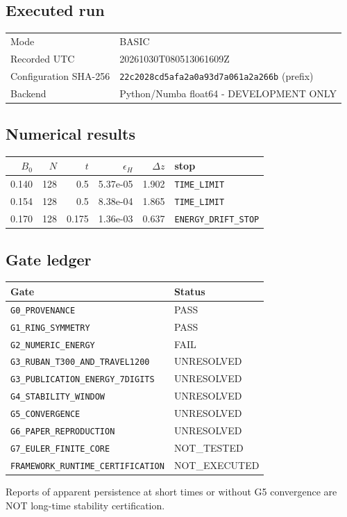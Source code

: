 \subsection*{Executed run}
\begin{tabular}{ll}\toprule
Mode & BASIC\\
Recorded UTC & 20261030T080513061609Z\\
Configuration SHA-256 & \texttt{22c2028cd5afa2a0a93d7a061a2a266b} (prefix)\\
Backend & Python/Numba float64 - DEVELOPMENT ONLY\\
\bottomrule\end{tabular}
\subsection*{Numerical results}
\begin{center}\small\begin{tabular}{rrrrrl}\toprule
$B_0$ & $N$ & $t$ & $\epsilon_H$ & $\Delta z$ & stop \\ \midrule
0.140 & 128 & 0.5 & 5.37e-05 & 1.902 & \texttt{TIME\_LIMIT} \\
0.154 & 128 & 0.5 & 8.38e-04 & 1.865 & \texttt{TIME\_LIMIT} \\
0.170 & 128 & 0.175 & 1.36e-03 & 0.637 & \texttt{ENERGY\_DRIFT\_STOP} \\
\bottomrule\end{tabular}\end{center}
\subsection*{Gate ledger}
\begin{tabular}{ll}\toprule Gate & Status \\ \midrule
\texttt{G0\_PROVENANCE} & PASS\\
\texttt{G1\_RING\_SYMMETRY} & PASS\\
\texttt{G2\_NUMERIC\_ENERGY} & FAIL\\
\texttt{G3\_RUBAN\_T300\_AND\_TRAVEL1200} & UNRESOLVED\\
\texttt{G3\_PUBLICATION\_ENERGY\_7DIGITS} & UNRESOLVED\\
\texttt{G4\_STABILITY\_WINDOW} & UNRESOLVED\\
\texttt{G5\_CONVERGENCE} & UNRESOLVED\\
\texttt{G6\_PAPER\_REPRODUCTION} & UNRESOLVED\\
\texttt{G7\_EULER\_FINITE\_CORE} & NOT\_TESTED\\
\texttt{FRAMEWORK\_RUNTIME\_CERTIFICATION} & NOT\_EXECUTED\\
\bottomrule\end{tabular}
\par\smallskip\noindent Reports of apparent persistence at short times or without G5 convergence are NOT long-time stability certification.\par
